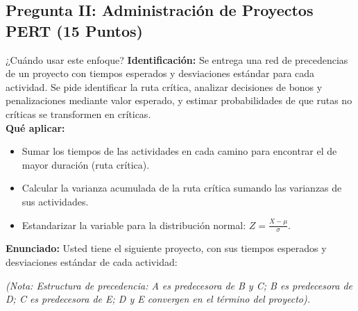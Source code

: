 \documentclass[11pt, a4paper]{article}
\begin{document}
\newpage

\subsection*{Pregunta II: Administración de Proyectos PERT (15 Puntos)}

  \begin{tipprueba}{¿Cuándo usar este enfoque?}
    \textbf{Identificación:} Se entrega una red de precedencias de un proyecto con tiempos esperados y desviaciones estándar para cada actividad. Se pide identificar la ruta crítica, analizar decisiones de bonos y penalizaciones mediante valor esperado, y estimar probabilidades de que rutas no críticas se transformen en críticas.\\
    \textbf{Qué aplicar:} 
    \begin{itemize}
      \item Sumar los tiempos de las actividades en cada camino para encontrar el de mayor duración (ruta crítica).
      \item Calcular la varianza acumulada de la ruta crítica sumando las varianzas de sus actividades.
      \item Estandarizar la variable para la distribución normal: $Z = \frac{X - \mu}{\sigma}$.
    \end{itemize}
  \end{tipprueba}

  \textbf{Enunciado:}
  Usted tiene el siguiente proyecto, con sus tiempos esperados y desviaciones estándar de cada actividad:
  
  \begin{center}
  \end{center}

  \textit{(Nota: Estructura de precedencia: A es predecesora de B y C; B es predecesora de D; C es predecesora de E; D y E convergen en el término del proyecto).}
\end{document}
